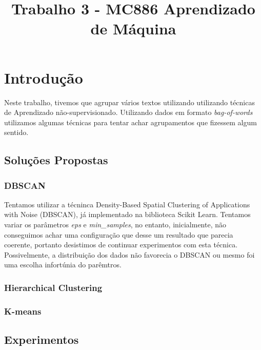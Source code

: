 \documentclass[conference]{IEEEtran}
\begin{document}
\title{Trabalho 3 - MC886 Aprendizado de Máquina}

\author{
\and
{}
}

\maketitle

\section{Introdução}

Neste trabalho, tivemos que agrupar vários textos utilizando utilizando técnicas de Aprendizado não-supervisionado. Utilizando dados em formato \textit{bag-of-words} utilizamos algumas técnicas para tentar achar agrupamentos que fizessem algum sentido.

\subsection{Soluções Propostas}

\subsubsection{DBSCAN}
Tentamos utilizar a técninca Density-Based Spatial Clustering of Applications with Noise (DBSCAN), já implementado na biblioteca Scikit Learn. Tentamos variar os parâmetros \textit{eps} e \textit{min\_samples}, no entanto, inicialmente, não conseguimos achar uma configuração que desse um resultado que parecia coerente, portanto desistimos de continuar experimentos com esta técnica. Possivelmente, a distribuição dos dados não favorecia o DBSCAN ou mesmo foi uma escolha infortúnia do parêmtros.

\subsubsection{Hierarchical Clustering}


\subsubsection{K-means}


\subsection{Experimentos}
\end{document}
